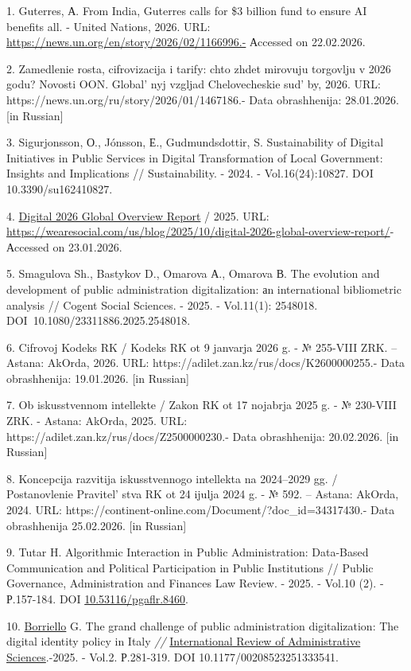\begin{refs}
1. Guterres, А. From India, Guterres calls for \$3 billion fund to ensure
AI benefits all. - United Nations, 2026. URL:
\url{https://news.un.org/en/story/2026/02/1166996.-} Аccessed on
22.02.2026.

2. Zamedlenie rosta, cifrovizacija i tarify: chto zhdet mirovuju
torgovlju v 2026 godu? Novosti OON. Global' nyj vzgljad
Chelovecheskie sud' by, 2026. URL:
https://news.un.org/ru/story/2026/01/1467186.- Data obrashhenija:
28.01.2026. {[}in Russian{]}

3. Sigurjonsson, О., Jónsson, Е., Gudmundsdottir, S. Sustainability of
Digital Initiatives in Public Services in Digital Transformation of
Local Government: Insights and Implications // Sustainability. - 2024. -
Vol.16(24):10827. DOI 10.3390/su162410827.

4. \href{https://datareportal.com/reports/digital-2026-global-overview-report}{Digital
2026 Global Overview Report} / 2025. URL:
\url{https://wearesocial.com/us/blog/2025/10/digital-2026-global-overview-report/}-
Аccessed on 23.01.2026.

5. Smagulova Sh., Bastykov D., Omarova А., Omarova В. The evolution and
development of public administration digitalization: аn international
bibliometric analysis // Cogent Social Sciences. - 2025. - Vol.11(1):
2548018. DOI~10.1080/23311886.2025.2548018.

6. Cifrovoj Kodeks RK / Kodeks RK ot 9 janvarja 2026 g. - № 255-VIII ZRK.
-- Astana: AkOrda, 2026. URL:
https://adilet.zan.kz/rus/docs/K2600000255.- Data obrashhenija:
19.01.2026. {[}in Russian{]}

7. Ob iskusstvennom intellekte / Zakon RK ot 17 nojabrja 2025 g. - №
230-VIII ZRK. - Astana: AkOrda, 2025. URL:
https://adilet.zan.kz/rus/docs/Z2500000230.- Data obrashhenija:
20.02.2026. {[}in Russian{]}

8. Koncepcija razvitija iskusstvennogo intellekta na 2024--2029 gg. /
Postanovlenie Pravitel' stva RK ot 24 ijulja 2024 g. - №
592. -- Astana: AkOrda, 2024. URL:
https://continent-online.com/Document/?doc\_id=34317430.- Data
obrashhenija 25.02.2026. {[}in Russian{]}

9. Tutar H. Algorithmic Interaction in Public Administration: Data-Based
Communication and Political Participation in Public Institutions //
Public Governance, Administration and Finances Law Review. - 2025. -
Vol.10 (2). - Р.157-184. DOI
\href{https://doi.org/10.53116/pgaflr.8460}{10.53116/pgaflr.8460}.

10. \href{https://journals.sagepub.com/doi/10.1177/00208523251333541\#con}{Borriello}
G. The grand challenge of public administration digitalization: The
digital identity policy in Italy \emph{//}
\href{https://journals.sagepub.com/home/RAS}{International Review of
Administrative Sciences}.-2025. - Vol.2. Р.281-319. DOI
10.1177/00208523251333541.


\end{refs}

